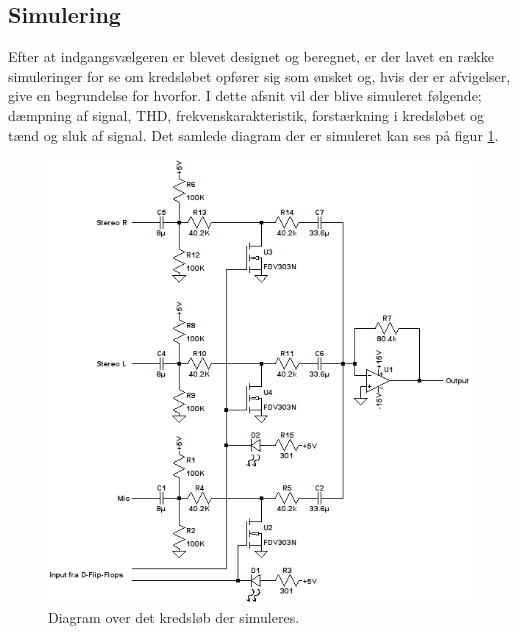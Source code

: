 \subsection{Simulering}
Efter at indgangsvælgeren er blevet designet og beregnet, er der lavet en række simuleringer for se om kredsløbet opfører sig som ønsket og, hvis der er afvigelser, give en begrundelse for hvorfor. I dette afsnit vil der blive simuleret følgende; dæmpning af signal, THD, frekvenskarakteristik, forstærkning i kredsløbet og tænd og sluk af signal. Det samlede diagram der er simuleret kan ses på figur \ref{diagram_simulering}. 

\begin{figure}[h]
\centering
\includegraphics[scale=0.8]{teknisk/indgangsvaelger/simulering/indgangvaelger_ltspice_diagram.png}
\caption{Diagram over det kredsløb der simuleres.}
\label{diagram_simulering}
\end{figure}

